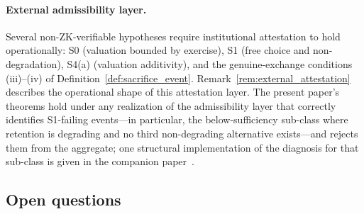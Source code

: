\paragraph{External admissibility layer.}
Several non-ZK-verifiable hypotheses require institutional
attestation to hold operationally: S0 (valuation bounded by
exercise), S1 (free choice and non-degradation), S4(a)
(valuation additivity), and the genuine-exchange conditions
(iii)--(iv) of Definition~\ref{def:sacrifice_event}.
Remark~\ref{rem:external_attestation} describes the operational
shape of this attestation layer.  The present paper's theorems
hold under any realization of the admissibility layer that
correctly identifies S1-failing events---in particular, the
below-sufficiency sub-class where retention is degrading and
no third non-degrading alternative exists---and rejects them
from the aggregate; one structural implementation of the
diagnosis for that sub-class is given in the companion
paper~\citep[Need~Sufficiency]{lasser2026paper8b}.

\subsection{Open questions}

